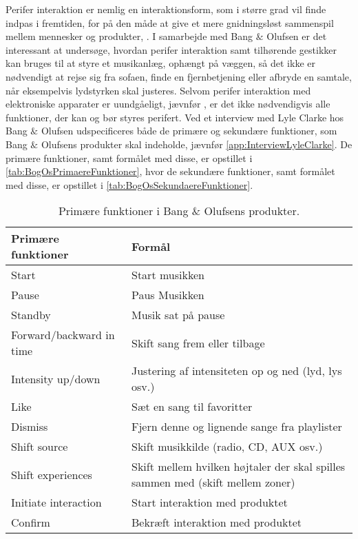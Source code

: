 Perifer interaktion er nemlig en interaktionsform, som i større grad vil finde indpas i fremtiden, for på den måde at give et mere gnidningsløst sammenspil mellem mennesker og produkter, \parencite[s. 1]{PDF:PIIntroduction}. I samarbejde med Bang $\&$ Olufsen er det interessant at undersøge, hvordan perifer interaktion samt tilhørende gestikker kan bruges til at styre et musikanlæg, ophængt på væggen, så det ikke er nødvendigt at rejse sig fra sofaen, finde en fjernbetjening eller afbryde en samtale, når eksempelvis lydstyrken skal justeres. Selvom perifer interaktion med elektroniske apparater er uundgåeligt, jævnfør \textcite[s. 1]{PDF:PIIntroduction}, er det ikke nødvendigvis alle funktioner, der kan og bør styres perifert. Ved et interview med Lyle Clarke hos Bang $\&$ Olufsen udspecificeres både de primære og sekundære funktioner, som Bang $\&$ Olufsens produkter skal indeholde, jævnfør \autoref{app:InterviewLyleClarke}. De primære funktioner, samt formålet med disse, er opstillet i \autoref{tab:BogOsPrimaereFunktioner}, hvor de sekundære funktioner, samt formålet med disse, er opstillet i \autoref{tab:BogOsSekundaereFunktioner}.
%
\begin{table}[H]
	\centering
	\begin{tabular}{ | l | p{8cm} |}
		\hline
		\multicolumn{1}{|l|}{\textbf{Primære funktioner}} & \multicolumn{1}{l|}{\textbf{Formål}} \\ \hline
		Start & Start musikken \\ \hline
		Pause & Paus Musikken \\ \hline
		Standby & Musik sat på pause \\ \hline
		Forward/backward in time & Skift sang frem eller tilbage \\ \hline
		Intensity up/down & Justering af intensiteten op og ned (lyd, lys osv.) \\ \hline
		Like & Sæt en sang til favoritter \\ \hline
		Dismiss & Fjern denne og lignende sange fra playlister \\ \hline
		Shift source & Skift musikkilde (radio, CD, AUX osv.) \\ \hline
		Shift experiences & Skift mellem hvilken højtaler der skal spilles sammen med (skift mellem zoner) \\ \hline
		Initiate interaction & Start interaktion med produktet \\ \hline
		Confirm & Bekræft interaktion med produktet \\ \hline
	\end{tabular}
	\caption{Primære funktioner i Bang $\&$ Olufsens produkter.}
	\label{tab:BogOsPrimaereFunktioner}
\end{table}
